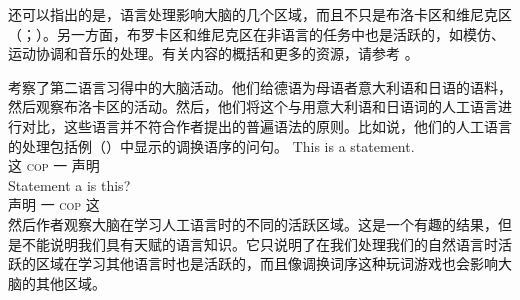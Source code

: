还可以指出的是，语言处理影响大脑的几个区域，而且不只是布洛卡区和维尼克区（\citealp[]{FM2005a}；\citealp{Friederici2009a}）。另一方面，布罗卡区和维尼克区在非语言的任务中也是活跃的，如模仿、运动协调和音乐的处理\citep{MKGF2001a}。有关内容的概括和更多的资源，请参考 。

 \citet{MMGRRBW2003a}考察了第二语言习得中的大脑活动。他们给德语为母语者意大利语和日语的语料，然后观察布洛卡区的活动。然后，他们将这个与用意大利语和日语词的人工语言进行对比，这些语言并不符合作者提出的普遍语法的原则。比如说，他们的人工语言的处理包括例（）中显示的调换语序的问句。
\eal
\ex 
\gll This is a statement.\\
这 \textsc{cop} 一 声明\\
\ex 
\gll Statement a is this?\\
     声明 一 \textsc{cop} 这\\
\zl
然后作者观察大脑在学习人工语言时的不同的活跃区域。这是一个有趣的结果，但是不能说明我们具有天赋的语言知识。它只说明了在我们处理我们的自然语言时活跃的区域在学习其他语言时也是活跃的，而且像调换词序这种玩词游戏也会影响大脑的其他区域。

